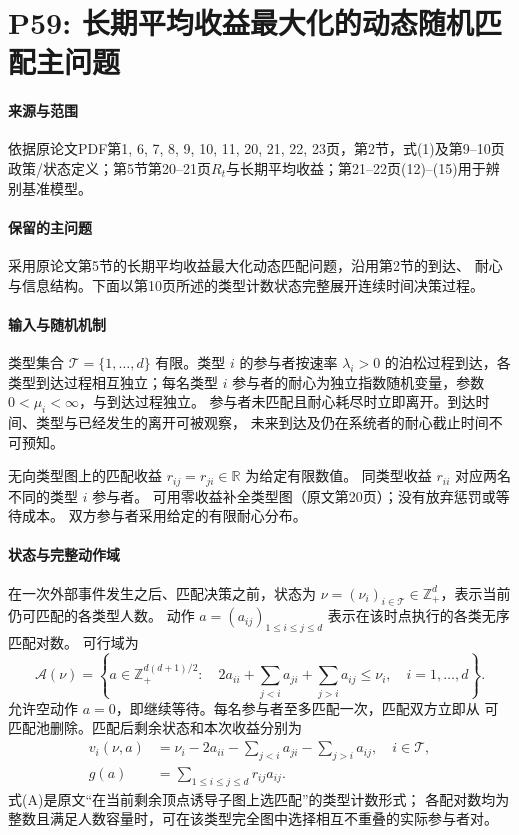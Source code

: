 \documentclass[UTF8,11pt]{ctexart}
\begin{document}
\section*{P59: 长期平均收益最大化的动态随机匹配主问题}
\paragraph{来源与范围}依据原论文PDF第1, 6, 7, 8, 9, 10, 11, 20, 21, 22, 23页，第2节，式(1)及第9--10页政策/状态定义；第5节第20--21页$R_t$与长期平均收益；第21--22页(12)--(15)用于辨别基准模型。

\paragraph{保留的主问题}
采用原论文第5节的长期平均收益最大化动态匹配问题，沿用第2节的到达、
耐心与信息结构。下面以第10页所述的类型计数状态完整展开连续时间决策过程。


\paragraph{输入与随机机制}
类型集合 $\mathcal T=\{1,\ldots,d\}$ 有限。类型 $i$ 的参与者按速率
$\lambda_i>0$ 的泊松过程到达，各类型到达过程相互独立；每名类型 $i$
参与者的耐心为独立指数随机变量，参数 $0<\mu_i<\infty$，与到达过程独立。
参与者未匹配且耐心耗尽时立即离开。到达时间、类型与已经发生的离开可被观察，
未来到达及仍在系统者的耐心截止时间不可预知。

无向类型图上的匹配收益 $r_{ij}=r_{ji}\in\mathbb R$ 为给定有限数值。
同类型收益 $r_{ii}$ 对应两名不同的类型 $i$ 参与者。
可用零收益补全类型图（原文第20页）；没有放弃惩罚或等待成本。
双方参与者采用给定的有限耐心分布。

\paragraph{状态与完整动作域}
在一次外部事件发生之后、匹配决策之前，状态为
$\nu=(\nu_i)_{i\in\mathcal T}\in\mathbb Z_+^d$，表示当前仍可匹配的各类型人数。
动作 $a=(a_{ij})_{1\le i\le j\le d}$ 表示在该时点执行的各类无序匹配对数。
可行域为
\begin{equation}
\mathcal A(\nu)=\left\{a\in\mathbb Z_+^{d(d+1)/2}:\quad
2a_{ii}+\sum_{j<i}a_{ji}+\sum_{j>i}a_{ij}\le\nu_i,
\quad i=1,\ldots,d\right\}.\tag{A}
\end{equation}
允许空动作 $a=0$，即继续等待。每名参与者至多匹配一次，匹配双方立即从
可匹配池删除。匹配后剩余状态和本次收益分别为
\begin{align}
v_i(\nu,a)&=\nu_i-2a_{ii}-\sum_{j<i}a_{ji}-\sum_{j>i}a_{ij},\quad i\in\mathcal T,\tag{S}\\
g(a)&=\sum_{1\le i\le j\le d}r_{ij}a_{ij}.\tag{R}
\end{align}
式(A)是原文“在当前剩余顶点诱导子图上选匹配”的类型计数形式；
各配对数均为整数且满足人数容量时，可在该类型完全图中选择相互不重叠的实际参与者对。
\end{document}

